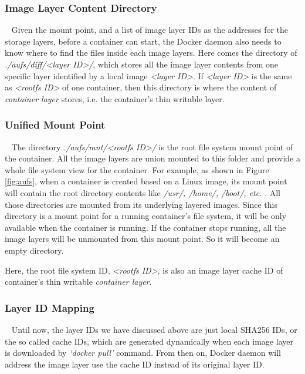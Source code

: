 
\smallbreak 
\subsubsection{Image Layer Content Directory}
~\smallbreak
Given the mount point, and a list of image layer IDs as the addresses for the storage layers, before a container can start, the Docker daemon also needs to know where to find the files inside each image layers. Here comes the directory of
 \textit{./aufs/diff/<layer ID>/}, which stores all the image layer contents from one specific layer identified by a local image \textit{<layer ID>}. If \textit{<layer ID>} is the same as \textit{<rootfs ID>} of one container, then this directory is where the content of \textit{container layer} stores, i.e. the container's thin writable layer. 

\smallbreak 
\subsubsection{Unified Mount Point} 
~\smallbreak
The directory \textit{./aufs/mnt/<rootfs ID>/ }  is the root file system mount point of the container. All the image layers are union mounted to this folder and provide a whole file system view for the container. For example, as shown in Figure \ref{fig:aufs}, when a container is created based on a Linux image, its mount point will contain the root directory contents like \textit{/usr/, /home/, /boot/, etc. }. All those directories are mounted from its underlying layered images. 
Since this directory is a mount point for a running container's file system, it will be only available when the container is running. If the container stops running, all the image layers will be unmounted from this mount point. So it will become an empty directory.

Here, the root file system ID, \textit{<rootfs ID>}, is also an image layer cache ID of container's thin writable \textit{container layer}. 

\smallbreak  
\subsubsection{Layer ID Mapping}  \label{intro:aufs:layerIDMapping}
~\smallbreak
Until now, the layer IDs we have discussed above are just local SHA256 IDs, or the so called cache IDs, which are generated dynamically when each image layer is downloaded by \textit{`docker pull'} command. From then on, Docker daemon will address the image layer use the cache ID instead of its original layer ID.

